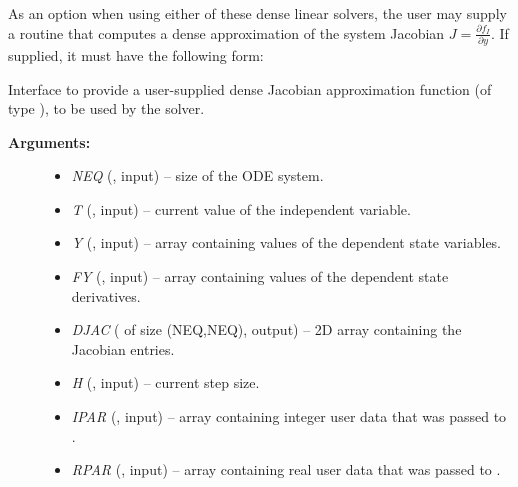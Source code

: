 \documentclass[letterpaper,10pt,english]{sphinxmanual}
\begin{document}
As an option when using either of these dense linear solvers, the user
may supply a routine that computes a dense approximation of the system
Jacobian $J = \frac{\partial f_I}{\partial y}$.  If supplied, it
must have the following form:

\begin{fulllineitems}
\label{f_interface/Usage:f/_/FARKDJAC}
Interface to provide a user-supplied dense Jacobian approximation
function (of type {\hyperref[c_interface/User_supplied:ARKDlsDenseJacFn]{}}), to be used by the
{\hyperref[f_interface/Usage:f/_/FARKDENSE]{}} solver.
\begin{description}
\item[{\textbf{Arguments:}}] \leavevmode\begin{itemize}
\item {} 
\emph{NEQ} (, input) -- size of the ODE system.

\item {} 
\emph{T} (, input) -- current value of the independent variable.

\item {} 
\emph{Y} (, input) -- array containing values of the dependent state variables.

\item {} 
\emph{FY} (, input) -- array containing values of the dependent state derivatives.

\item {} 
\emph{DJAC} ( of size (NEQ,NEQ), output) -- 2D array containing the Jacobian entries.

\item {} 
\emph{H} (, input) -- current step size.

\item {} 
\emph{IPAR} (, input) -- array containing integer user data that was passed to
{\hyperref[f_interface/Usage:f/_/FARKMALLOC]{}}.

\item {} 
\emph{RPAR} (, input) -- array containing real user data that was passed to
{\hyperref[f_interface/Usage:f/_/FARKMALLOC]{}}.


\end{itemize}
\end{description}
\end{fulllineitems}
\end{document}
